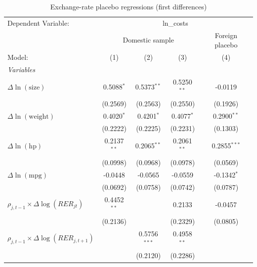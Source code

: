 
\begin{table}[htbp]
   \caption{\label{tab:cost_reg_placebo_fd} Exchange-rate placebo regressions (first differences)}
   \centering
   \begin{tabular}{lcccc}
      \tabularnewline \midrule \midrule
      Dependent Variable: & \multicolumn{4}{c}{ln\_costs}\\
       & \multicolumn{3}{c}{Domestic sample} & Foreign placebo \\
      Model:                                          & (1)            & (2)            & (3)            & (4)\\
      \midrule
      \emph{Variables}\\
      $\Delta\ln(\text{size})$                        & 0.5088$^{*}$  & 0.5373$^{**}$  & 0.5250$^{**}$ & -0.0119\\
                                                      & (0.2569)      & (0.2563)       & (0.2550)      & (0.1926)\\
      $\Delta\ln(\text{weight})$                      & 0.4020$^{*}$  & 0.4201$^{*}$   & 0.4077$^{*}$  & 0.2900$^{**}$\\
                                                      & (0.2222)      & (0.2225)       & (0.2231)      & (0.1303)\\
      $\Delta\ln(\text{hp})$                          & 0.2137$^{**}$ & 0.2065$^{**}$  & 0.2061$^{**}$ & 0.2855$^{***}$\\
                                                      & (0.0998)      & (0.0968)       & (0.0978)      & (0.0569)\\
      $\Delta\ln(\text{mpg})$                         & -0.0448       & -0.0565        & -0.0559       & -0.1342$^{*}$\\
                                                      & (0.0692)      & (0.0758)       & (0.0742)      & (0.0787)\\
      $\rho_{j,t-1}\times\Delta\log(RER_{jt})$        & 0.4452$^{**}$ &                & 0.2133        & -0.0457\\
                                                      & (0.2136)      &                & (0.2329)      & (0.0805)\\
      $\rho_{j,t-1}\times\Delta\log(RER_{j,t+1})$     &               & 0.5756$^{***}$ & 0.4958$^{**}$ &   \\
                                                      &               & (0.2120)       & (0.2286)      &   \\
      \midrule

\end{tabular}
\end{table}
